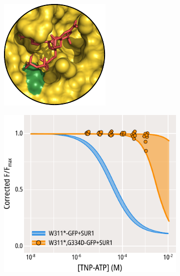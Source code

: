 \begin{figure}[h]
	\centering
	\begin{subfigure}[t]{0.3\textwidth}
		\caption{}\label{ch5fig:g334d_loc}
		\centering
		\includegraphics[width=\textwidth]{g334d_1.pdf}
	\end{subfigure}
	\hfill
	\begin{subfigure}[t]{0.5\textwidth}
		\caption{}\label{ch5fig:g334d_popfits}
		\centering
		\includegraphics[width=\textwidth]{g334d_2.pdf}

\end{subfigure}
\end{figure}
